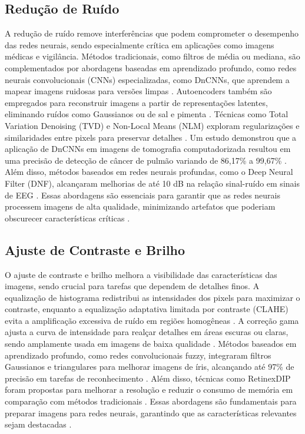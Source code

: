 \subsection{Redução de Ruído}
A redução de ruído remove interferências que podem comprometer o desempenho das redes neurais, sendo especialmente crítica em aplicações como imagens médicas e vigilância. Métodos tradicionais, como filtros de média ou mediana, são complementados por abordagens baseadas em aprendizado profundo, como redes neurais convolucionais (CNNs) especializadas, como DnCNNs, que aprendem a mapear imagens ruidosas para versões limpas \cite{sharma2024deep}. Autoencoders também são empregados para reconstruir imagens a partir de representações latentes, eliminando ruídos como Gaussianos ou de sal e pimenta \cite{sharma2024deep}. Técnicas como Total Variation Denoising (TVD) e Non-Local Means (NLM) exploram regularizações e similaridades entre pixels para preservar detalhes \cite{sharma2024deep}. Um estudo demonstrou que a aplicação de DnCNNs em imagens de tomografia computadorizada resultou em uma precisão de detecção de câncer de pulmão variando de 86,17\% a 99,67\% \cite{sharma2024deep}. Além disso, métodos baseados em redes neurais profundas, como o Deep Neural Filter (DNF), alcançaram melhorias de até 10 dB na relação sinal-ruído em sinais de EEG \cite{peer2022real}. Essas abordagens são essenciais para garantir que as redes neurais processem imagens de alta qualidade, minimizando artefatos que poderiam obscurecer características críticas \cite{sharma2024deep}.

\subsection{Ajuste de Contraste e Brilho}
O ajuste de contraste e brilho melhora a visibilidade das características das imagens, sendo crucial para tarefas que dependem de detalhes finos. A equalização de histograma redistribui as intensidades dos pixels para maximizar o contraste, enquanto a equalização adaptativa limitada por contraste (CLAHE) evita a amplificação excessiva de ruído em regiões homogêneas \cite{sciencedirect2023normalization}. A correção gama ajusta a curva de intensidade para realçar detalhes em áreas escuras ou claras, sendo amplamente usada em imagens de baixa qualidade \cite{sciencedirect2023normalization}. Métodos baseados em aprendizado profundo, como redes convolucionais fuzzy, integraram filtros Gaussianos e triangulares para melhorar imagens de íris, alcançando até 97\% de precisão em tarefas de reconhecimento \cite{sharma2024deep}. Além disso, técnicas como RetinexDIP foram propostas para melhorar a resolução e reduzir o consumo de memória em comparação com métodos tradicionais \cite{sharma2024deep}. Essas abordagens são fundamentais para preparar imagens para redes neurais, garantindo que as características relevantes sejam destacadas \cite{sciencedirect2023normalization}.

